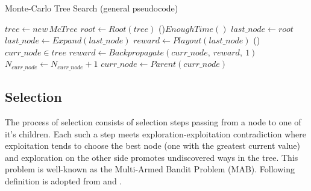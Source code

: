 \begin{algorithm}
\DontPrintSemicolon
\caption{Monte-Carlo Tree Search (general pseudocode)\label{sec_mcts_description}}
\label{alg_mcts_loop_general}
$tree \leftarrow new\,McTree$ \;
$root \leftarrow Root(tree)$\;
\While(){$EnoughTime()$}{
    $last\_node \leftarrow root$ \;
    $last\_node \leftarrow Expand(last\_node)$ \;
    $reward \leftarrow Playout(last\_node)$ \;
    \While(){$curr\_node \in tree$}{
        $reward \leftarrow Backpropagate(curr\_node,\:reward,\:1)$\;
        $N_{curr\_node} \leftarrow N_{curr\_node}+1$ \;
        $curr\_node \leftarrow Parent(curr\_node)$\;
    }
}
 \;
\end{algorithm}


\subsection{Selection}

The process of selection consists of selection steps passing from a node to one of it's children.
Each such a step meets exploration-exploitation contradiction where exploitation tends to choose the
best node (one with the greatest current value) and exploration on the other side promotes
undiscovered ways in the tree. This problem is well-known as the Multi-Armed Bandit Problem (MAB).
Following definition is adopted from \cite{Auer2002} and \cite{Kocsis2006}.

